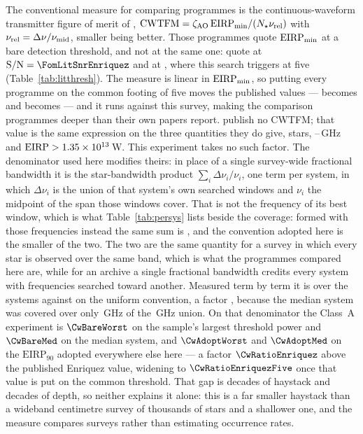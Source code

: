 The conventional measure for comparing programmes is the continuous-waveform
transmitter figure of merit of \citet{Enriquez2017},
$\mathrm{CWTFM}=\zeta_{\rm AO}\,\mathrm{EIRP}_{\rm min}/
(N_{\star}\nu_{\rm rel})$ with $\nu_{\rm rel}=\Delta\nu/\nu_{\rm mid}$,
smaller being better. Those programmes quote $\mathrm{EIRP}_{\rm min}$ at a
bare detection threshold, and not at the same one: \citet{Enriquez2017} quote
at $\mathrm{S/N}=\FomLitSnrEnriquez$ and \citet{Margot2023} at
\FomLitSnrMargot, where this search triggers at five
(Table~\ref{tab:litthresh}). The measure is linear in
$\mathrm{EIRP}_{\rm min}$, so putting every programme on the common footing
of five moves the published values --- \FomLitEnriquez{} becomes
\FomLitEnriquezFive{} and \FgLitMargot{} becomes \FgLitMargotFive{} --- and
it runs against this survey, making the comparison programmes deeper than
their own papers report. \citet{Margot2023} publish no CWTFM; that value is
the same expression on the three quantities they do give, \FomMargotN{}
stars, \FomMargotLo--\FomMargotHi\,GHz and
$\mathrm{EIRP}>1.35\times10^{13}$\,W. This experiment takes no such factor. The
denominator used here modifies theirs: in place of a single survey-wide
fractional bandwidth it is the star-bandwidth product
$\sum_{i}\Delta\nu_{i}/\nu_{i}$, one term per system, in which
$\Delta\nu_{i}$ is the union of that system's own searched windows and
$\nu_{i}$ the midpoint of the span those windows cover. That is not the
frequency of its best window, which is what Table~\ref{tab:persys} lists
beside the coverage: formed with those frequencies instead the same sum is
\CwSigmaBest, and the convention adopted here is the smaller of the two. The
two are the same
quantity for a survey in which every star is observed over the same band,
which is what the programmes compared here are, while for an archive a
single fractional bandwidth credits every system with frequencies searched
toward another. Measured term by term it is \CwSigma{} over the \CwNSys{}
systems against \CwUniform{} on the uniform convention, a factor \CwRatio,
because the median system was covered over only \SysUnionAMed\,GHz of the
\CvUnionA\,GHz union. On that denominator the Class~A experiment is
$\CwBareWorst$ on the sample's largest threshold power and $\CwBareMed$ on
the median system, and $\CwAdoptWorst$ and $\CwAdoptMed$ on the
$\mathrm{EIRP}_{90}$ adopted everywhere else here --- a factor
$\CwRatioEnriquez$ above the published Enriquez value, widening to
$\CwRatioEnriquezFive$ once that value is put on the common threshold. That
gap is \CwBandDex{} decades of haystack and \CwEirpDex{} decades of depth, so
neither explains it alone: this is a far smaller haystack than a wideband
centimetre survey of thousands of stars and a shallower one, and the measure
compares surveys rather than estimating occurrence rates.

